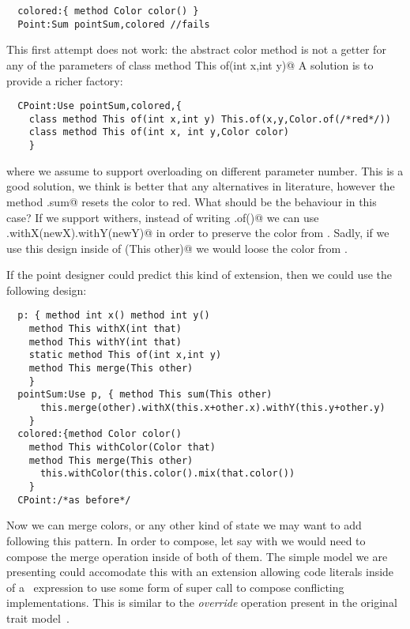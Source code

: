 \begin{lstlisting}
  colored:{ method Color color() }
  Point:Sum pointSum,colored //fails
\end{lstlisting}

This first attempt does not work: the abstract color method
is not a getter for any of the parameters of 
\Q@ class method This of(int x,int y)@
A solution is to provide a richer factory:

\begin{lstlisting}
  CPoint:Use pointSum,colored,{
    class method This of(int x,int y) This.of(x,y,Color.of(/*red*/))
    class method This of(int x, int y,Color color)
    }
\end{lstlisting}

where we assume to support overloading on different parameter number.
This is a good solution, we think is better that any alternatives in literature,
however the method \Q@CPoint.sum@ resets the color to red.
What should be the behaviour in this case?
If we support withers, instead of writing \Q@This.of()@ we can use
\Q@this.withX(newX).withY(newY)@ in order to preserve the color from \Q@this@.
Sadly, if we use this design inside of \Q@sum(This other)@ we would loose the color from \Q@other@.

If the point designer could predict this kind of extension, then we could use the following design:  
\begin{lstlisting}
  p: { method int x() method int y()
    method This withX(int that)
    method This withY(int that)
    static method This of(int x,int y)
    method This merge(This other)
    }
  pointSum:Use p, { method This sum(This other)
      this.merge(other).withX(this.x+other.x).withY(this.y+other.y)
    }
  colored:{method Color color()
    method This withColor(Color that)
    method This merge(This other)
      this.withColor(this.color().mix(that.color())
    }
  CPoint:/*as before*/
\end{lstlisting}  
  Now we can merge colors, or any other kind of state we may want to add
  following this pattern.
  In order to compose, let say \Q@colored@ with \Q@flavored@ we would
  need to compose the merge operation inside of both of them.
  The simple model we are presenting could accomodate this with an
  extension allowing code literals inside of a \use\ expression to use some form of super call to compose conflicting implementations. This is similar to the \emph{override} operation present in the original trait model~\cite{ducasse2006traits}.
  
  